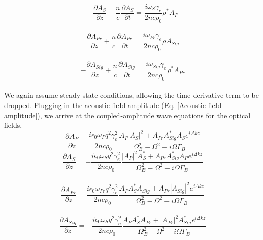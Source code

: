\documentclass[sn-nature]{sn-jnl}%
\begin{document}
\begin{equation}
    -\frac{\partial A_{S}}{\partial z} + \frac{n}{c}\frac{\partial A_{S}}{\partial t} = \frac{i\omega_{S}\gamma_{e}}{2nc\rho_{0}}\rho^{*}A_{P}
\end{equation}
\\
\begin{equation}
    \frac{\partial A_{Pr}}{\partial z} + \frac{n}{c}\frac{\partial A_{Pr}}{\partial t} = \frac{i\omega_{Pr}\gamma_{e}}{2nc\rho_{0}}\rho A_{Sig}
\end{equation}
\\
\begin{equation}
    -\frac{\partial A_{Sig}}{\partial z} + \frac{n}{c}\frac{\partial A_{Sig}}{\partial t} = \frac{i\omega_{Sig}\gamma_{e}}{2nc\rho_{0}}\rho^{*}A_{Pr}
\end{equation}
\\
We again assume steady-state conditions, allowing the time derivative term to be dropped. Plugging in the acoustic field amplitude (Eq. \ref{Acoustic field amplitude}), we arrive at the coupled-amplitude wave equations for the optical fields,
\begin{equation}
    \frac{\partial A_{P}}{\partial z} = \frac{i\epsilon_{0}\omega_{P} q^{2}\gamma_{e}^{2}}{2nc\rho_{0}}\frac{A_{P}|A_{S}|^{2} + A_{Pr}A_{Sig}^{*}A_{S}e^{i\Delta kz}}{\Omega_{B}^{2} - \Omega^{2} - i\Omega\Gamma_{B}}
\end{equation}
\begin{equation}
    \frac{\partial A_{S}}{\partial z} = -\frac{i\epsilon_{0}\omega_{S} q^{2}\gamma_{e}^{2}}{2nc\rho_{0}}\frac{|A_{P}|^{2}A_{S}^{*} + A_{Pr}A_{Sig}^{*}A_{P}e^{i\Delta kz}}{\Omega_{B}^{2} - \Omega^{2} - i\Omega\Gamma_{B}}
\end{equation}
\\
\begin{equation}
    \frac{\partial A_{Pr}}{\partial z} = \frac{i\epsilon_{0}\omega_{Pr} q^{2}\gamma_{e}^{2}}{2nc\rho_{0}}\frac{A_{P}A_{S}^{*}A_{Sig} + A_{Pr}|A_{Sig}|^{2}e^{i\Delta kz}}{\Omega_{B}^{2} - \Omega^{2} - i\Omega\Gamma_{B}}
\end{equation}
\\
\begin{equation}
    \frac{\partial A_{Sig}}{\partial z} = -\frac{i\epsilon_{0}\omega_{S} q^{2}\gamma_{e}^{2}}{2nc\rho_{0}}\frac{A_{P}A_{S}^{*}A_{Pr} + |A_{Pr}|^{2}A_{Sig}^{*}e^{i\Delta kz}}{\Omega_{B}^{2} - \Omega^{2} - i\Omega\Gamma_{B}}
\end{equation}
\\

\end{document}
